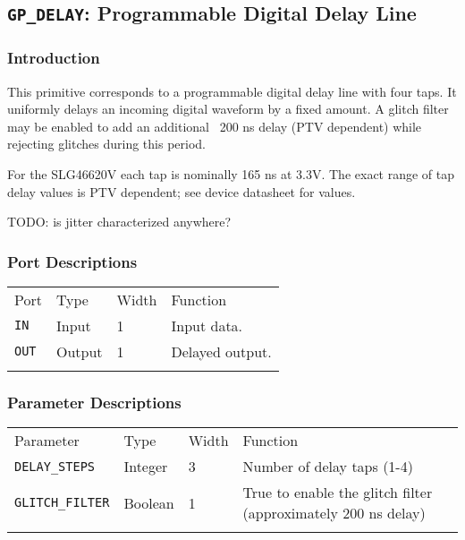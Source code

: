 \documentclass[11pt]{article}
\newcommand{\tokenstyle}[1]{\texttt{#1}}
\newcommand{\whenstyle}[1]{{\fontseries{sb}\selectfont#1}}
\newcommand{\thinhline}{\Xhline{1\arrayrulewidth}}
\newcommand{\thickhline}{\Xhline{2.5\arrayrulewidth}}
\begin{document}

\pagebreak
\subsection{\tokenstyle{GP\_DELAY}: Programmable Digital Delay Line}
\label{gp-delay}

\subsubsection{Introduction}
This primitive corresponds to a programmable digital delay line with four taps. It uniformly delays an incoming digital
waveform by a fixed amount. A glitch filter may be enabled to add an additional ~200 ns delay (PTV dependent) while
rejecting glitches during this period.

For the SLG46620V each tap is nominally 165 ns at 3.3V. The exact range of tap delay values is PTV dependent; see
device datasheet for values.

TODO: is jitter characterized anywhere?

\subsubsection{Port Descriptions}

\begin{tabularx}{\textwidth}{lllX}
\thinhline
\whenstyle{Port} & \whenstyle{Type} & \whenstyle{Width} & \whenstyle{Function} \\
\thickhline
\tokenstyle{IN} & Input & 1 & Input data. \\
\thinhline
\tokenstyle{OUT} & Output & 1 & Delayed output. \\
\thinhline
\end{tabularx}

\subsubsection{Parameter Descriptions}

\begin{tabularx}{\textwidth}{lllX}
\thinhline
\whenstyle{Parameter} & \whenstyle{Type} & \whenstyle{Width} & \whenstyle{Function} \\
\thickhline
\tokenstyle{DELAY\_STEPS} & Integer & 3 & Number of delay taps (1-4) \\
\thinhline
\tokenstyle{GLITCH\_FILTER} & Boolean & 1 & True to enable the glitch filter (approximately 200 ns delay) \\
\thinhline
\end{tabularx}
\end{document}
